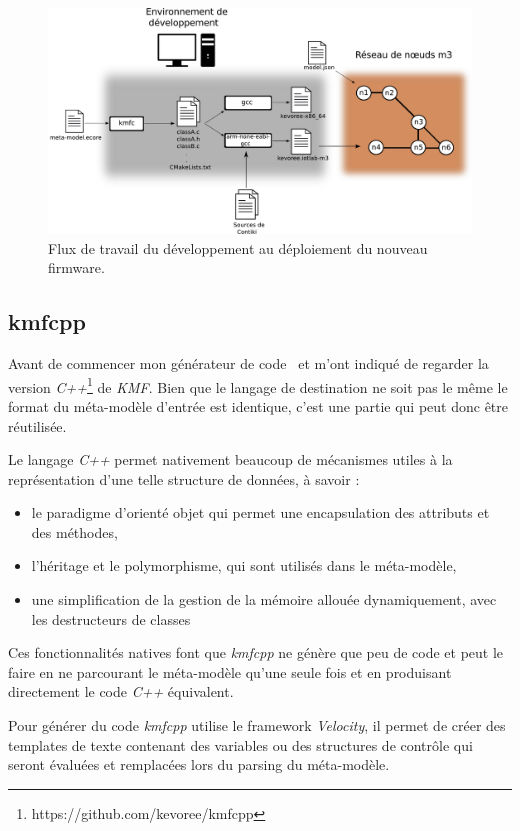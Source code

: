 \begin{figure}[ht!]
\centering
\includegraphics[scale=0.55]{images/workflow-schema/workflow.pdf}
\caption{Flux de travail du développement au déploiement du nouveau firmware.}
\label{workfow}
\end{figure}

\subsection{\label{kmfcpp}kmfcpp}

Avant de commencer mon générateur de code \johann~et \paco m'ont indiqué de regarder la version \emph{C++}\footnote{https://github.com/kevoree/kmfcpp} de \emph{KMF}. Bien que le langage de destination ne soit pas le même le format du méta-modèle d'entrée est identique, c'est une partie qui peut donc être réutilisée.

Le langage \emph{C++} permet nativement beaucoup de mécanismes utiles à la représentation d'une telle structure de données, à savoir :

\begin{itemize}
\item le paradigme d'orienté objet qui permet une encapsulation des attributs et des méthodes,
\item l'héritage et le polymorphisme, qui sont utilisés dans le méta-modèle,
\item une simplification de la gestion de la mémoire allouée dynamiquement, avec les destructeurs de classes
\end{itemize}

Ces fonctionnalités natives font que \emph{kmfcpp} ne génère que peu de code et peut le faire en ne parcourant le méta-modèle qu'une seule fois et en produisant directement le code \emph{C++} équivalent.

Pour générer du code \emph{kmfcpp} utilise le framework \emph{Velocity}\cite{velocity}, il permet de créer des templates de texte contenant des variables ou des structures de contrôle qui seront évaluées et remplacées lors du parsing du méta-modèle.

